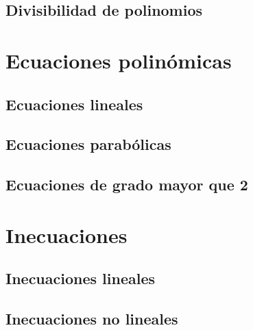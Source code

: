 \section{Divisibilidad de polinomios}

\chapter{Ecuaciones polinómicas}
\minitoc

\section{Ecuaciones lineales}
\section{Ecuaciones parabólicas}
\section{Ecuaciones de grado mayor que 2}

\chapter{Inecuaciones}
\minitoc

\section{Inecuaciones lineales}
\section{Inecuaciones no lineales}


